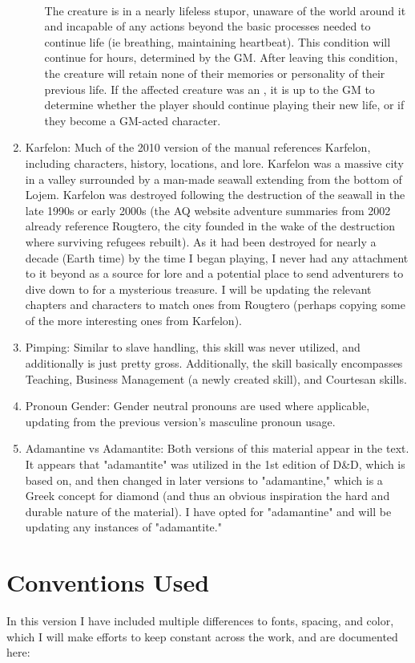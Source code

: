 \begin{enumerate}[leftmargin=12pt]
\begin{enumerate}
	\\
	The creature is in a nearly lifeless stupor, unaware of the world around it and incapable of any actions beyond the basic processes needed to continue life (ie breathing, maintaining heartbeat). This condition will continue for  hours, determined by the GM. After leaving this condition, the creature will retain none of their memories or personality of their previous life. If the affected creature was an , it is up to the GM to determine whether the player should continue playing their new life, or if they become a GM-acted character.
\end{enumerate}
\item Karfelon: Much of the 2010 version of the manual references Karfelon, including characters, history, locations, and lore. Karfelon was a massive city in a valley surrounded by a man-made seawall extending from the bottom of Lojem. Karfelon was destroyed following the destruction of the seawall in the late 1990s or early 2000s (the AQ website adventure summaries from 2002 already reference Rougtero, the city founded in the wake of the destruction where surviving refugees rebuilt). As it had been destroyed for nearly a decade (Earth time) by the time I began playing, I never had any attachment to it beyond as a source for lore and a potential place to send adventurers to dive down to for a mysterious treasure. I will be updating the relevant chapters and characters to match ones from Rougtero (perhaps copying some of the more interesting ones from Karfelon).
\item Pimping: Similar to slave handling, this skill was never utilized, and additionally is just pretty gross. Additionally, the skill basically encompasses Teaching, Business Management (a newly created skill), and Courtesan skills. 
\item Pronoun Gender: Gender neutral pronouns are used where applicable, updating from the previous version's masculine pronoun usage.
\item Adamantine vs Adamantite: Both versions of this material appear in the text. It appears that "adamantite" was utilized in the 1st edition of D\&D, which \aq is based on, and then changed in later versions to "adamantine," which is a Greek concept for diamond (and thus an obvious inspiration the hard and durable nature of the material). I have opted for "adamantine" and will be updating any instances of "adamantite."
\end{enumerate}
\section{Conventions Used}
In this version I have included multiple differences to fonts, spacing, and color, which I will make efforts to keep constant across the work, and are documented here:

